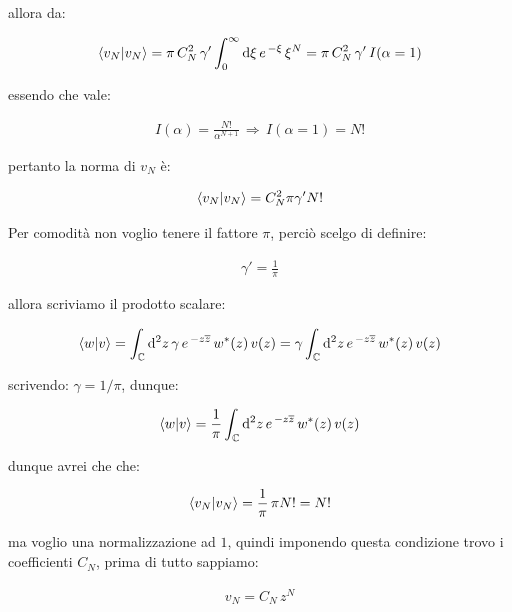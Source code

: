 	allora da:

\begin{align*}
	\braket{v_N}{v_N} = \pi \, C_N^2 \, \gamma' \int_0^{\infty} \dd \xi \, e^{\, -\xi} \, \xi^{N} = \pi \, C_N^2 \, \gamma' \, I(\alpha = 1)
\end{align*}

	essendo che vale:
	
\begin{align*}
	I(\alpha) = \frac{N!}{\alpha^{N+1}} \, \Rightarrow \, I(\alpha = 1) = N!
\end{align*}

	pertanto la norma di $v_N$ è:

\begin{nb}
\begin{align*}
	\braket{v_N} = C_N^2 \pi \gamma' N!
\end{align*}
\end{nb}

	Per comodità non voglio tenere il fattore $\pi$, perciò scelgo di definire:
	
\begin{align*}
	\gamma' = \frac{1}{\pi}
\end{align*}

	allora scriviamo il prodotto scalare:

\begin{align*}
	\braket{w}{v} =  \int_{\mathbb{C}} \dd^2 z \, \gamma\, e^{\, -z\overline{z}} \, w^*(z) \, v(z) = \gamma \int_{\mathbb{C}} \dd^2 z \, e^{\, -z\overline{z}} \, w^*(z) \, v(z)
\end{align*}

	scrivendo: $\gamma = 1/\pi$, dunque:
	
\begin{align*}
	\braket{w}{v} = \frac{1}{\pi} \int_{\mathbb{C}} \dd^2 z \, e^{\, -z\overline{z}} \, w^*(z) \, v(z)
\end{align*}

	dunque avrei che che:

\begin{nb}
\begin{align*}
	\braket{v_N} = \frac{1}{\pi} \, \pi N! = N!
\end{align*}
\end{nb}

	ma voglio una normalizzazione ad $1$, quindi imponendo questa condizione trovo i coefficienti $C_N$, prima di tutto sappiamo:

\begin{align*}
	v_N = C_N \, z^N 
\end{align*}
	
